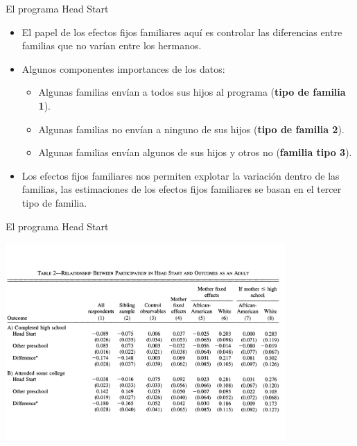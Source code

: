 \documentclass[11pt, aspectratio=169, compress]{beamer}
\begin{document}
\begin{frame}[t]{El programa Head Start}
	\begin{itemize}
	\item El papel de los efectos fijos familiares aquí es controlar las diferencias entre familias que no varían entre los hermanos.
	\item Algunos componentes importances de los datos: 
	\begin{itemize}
	\item Algunas familias envían a todos sus hijos al programa (\textbf{tipo de familia 1}).
	\item Algunas familias no envían a ninguno de sus hijos (\textbf{tipo de familia 2}).
	\item Algunas familias envían algunos de sus hijos y otros no (\textbf{familia tipo 3}).
	\end{itemize}
	\item Los efectos fijos familiares nos permiten explotar la variación dentro de las familias, las estimaciones de los efectos fijos familiares se basan en el tercer tipo de familia. 
	\end{itemize}
\end{frame}
\begin{frame}[t]{El programa Head Start}
	\vspace*{-2.5ex}
	\begin{center}
	\includegraphics[width=0.8\textwidth]{tab1}
	\end{center} 
\end{frame}
\end{document}
